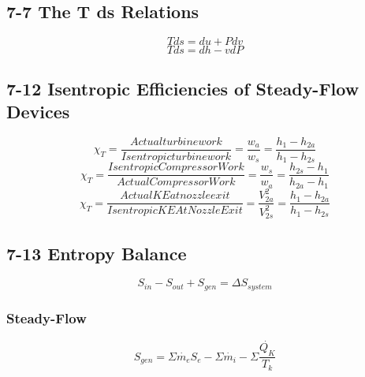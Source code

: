 \documentclass[10pt,landscape]{article}
\begin{document}
\begin{multicols}{3}
\subsection{7-7 The T ds Relations}
\begin{equation}
    Tds=du+Pdv
\end{equation}
\begin{equation}
    Tds=dh-vdP
\end{equation}
\subsection{7-12 Isentropic Efficiencies of Steady-Flow Devices}
\begin{equation}
    \chi_T=\frac{Actual turbine work}{Isentropic turbine work}=\frac{w_a}{w_s}=\frac{h_1-h_{2a}}{h_1-h_{2s}}
\end{equation}
\begin{equation}
    \chi_T=\frac{Isentropic Compressor Work}{Actual Compressor Work}=\frac{w_s}{w_a}=\frac{h_{2s}-h_1}{h_{2a}-h_1}
\end{equation}
\begin{equation}
    \chi_T=\frac{Actual KE at nozzle exit}{Isentropic KE At Nozzle Exit}=\frac{V^2_{2a}}{V^2_{2s}}=\frac{h_1-h_{2a}}{h_1-h_{2s}}
\end{equation}
\subsection{7-13 Entropy Balance}
\begin{equation}
    S_{in}-S_{out}+S_{gen}=\Delta S_{system}
\end{equation}
\subsubsection{Steady-Flow}
\begin{equation}
    S_{gen}=\Sigma \dot{m_e}S_e-\Sigma\dot{m_i}-\Sigma\frac{\dot{Q_K}}{T_k}
\end{equation}

\end{multicols}
\end{document}
